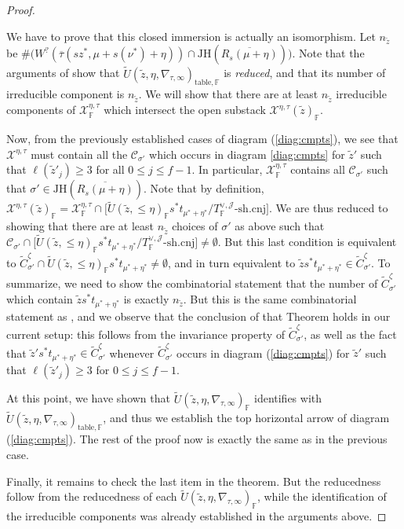 \documentclass[oneside,a4paper,english, 11pt]{amsart}
\theoremstyle{plain}
\theoremstyle{plain}
\theoremstyle{plain}
\theoremstyle{plain}
\theoremstyle{plain}
\theoremstyle{plain}
\theoremstyle{definition}
\theoremstyle{definition}
\theoremstyle{definition}
\theoremstyle{remark}
\numberwithin{equation}{section}
\newcommand{\F}{\mathbb{F}}
\newcommand{\cC}{\mathcal{C}}
\newcommand{\cJ}{\mathcal{J}}
\newcommand{\cX}{\mathcal{X}}
\newcommand{\tld}[1]{\widetilde{#1}}
\newcommand{\taubar}{\overline{\tau}}
\newcommand{\ovl}[1]{\overline{#1}}
\begin{document}
\begin{proof}
\begin{enumerate}
We have to prove that this closed immersion is actually an isomorphism. 
%
Let $n_{\tld{z}}$ be $\# \big(W^?(\taubar(sz^*,\mu+s(\nu^*)+\eta))\cap \mathrm{JH}(\ovl{R_s(\mu+\eta)})\big)$.
%
Note that the arguments of \cite[\S 8]{LLLM} show that $\tld{U}(\tld{z},\eta,\nabla_{\tau,\infty})_{\mathrm{table},\F}$ is \emph{reduced}, and that its number of irreducible component is $n_{\tld{z}}$.
%
%
%
We will show that there are at least $n_{\tld{z}}$ irreducible components of $\cX^{\eta,\tau}_\F$ which intersect the open substack $\cX^{\eta,\tau}(\tld{z})_\F$.

Now, from the previously established cases of diagram (\ref{diag:cmpts}), we see that $\cX^{\eta,\tau}$ must contain all the $\cC_{\sigma'}$ which occurs in diagram \ref{diag:cmpts} for $\tld{z}'$ such that $\ell(\tld{z}'_j)\geq 3$ for all $0\leq j \leq f-1$. In particular, $\cX^{\eta,\tau}_\F$ contains all $\cC_{\sigma'}$ such that $\sigma' \in \mathrm{JH}(\ovl{R_s(\mu+\eta)})$.  %
Note that by definition, $\cX^{\eta,\tau}(\tld{z})_{\F}=\cX^{\eta,\tau}_\F\cap \Big[\tld{U}(\tld{z},\leq \eta)_\F s^*t_{\mu^*+\eta^*}/T^{\vee,\cJ}_\F\text{-sh.cnj}\Big]$. We are thus reduced to showing that there are at least $n_{\tld{z}}$ choices of $\sigma'$ as above such that $\cC_{\sigma'} \cap \Big[\tld{U}(\tld{z},\leq \eta)_\F s^*t_{\mu^*+\eta^*}/T^{\vee,\cJ}_\F\text{-sh.cnj}\Big]\neq \emptyset$. But this last condition is equivalent to $\tld{C}^\zeta_{\sigma'}\cap \tld{U}(\tld{z},\leq \eta)_\F s^*t_{\mu^*+\eta^*}\neq \emptyset$, and in turn equivalent to $\tld{z}s^*t_{\mu^*+\eta^*}\in \tld{C}^{\zeta}_{\sigma'}$. To summarize, we need to show the combinatorial statement that the number of $\tld{C}^{\zeta}_{\sigma'}$ which contain $\tld{z}s^*t_{\mu^*+\eta^*}$ is exactly $n_{\tld{z}}$.
%
But this is the same combinatorial statement as \cite[Theorem 4.7.6]{MLM}, and we observe that the conclusion of that Theorem holds in our current setup: this follows from the invariance property \cite[Proposition 4.3.5]{MLM} of $\tld{C}^{\zeta}_{\sigma'}$, as well as the fact that $\tld{z}'s^*t_{\mu^*+\eta^*}\in \tld{C}^{\zeta}_{\sigma'}$ whenever $\tld{C}^{\zeta}_{\sigma'}$ occurs in diagram (\ref{diag:cmpts}) for $\tld{z}'$ such that $\ell(\tld{z}'_j)\geq 3$ for $0\leq j \leq f-1$.

At this point, we have shown that $\tld{U}(\tld{z},\eta,\nabla_{\tau,\infty})_{\F}$ identifies with $\tld{U}(\tld{z},\eta,\nabla_{\tau,\infty})_{\mathrm{table},\F}$, and thus we establish the top horizontal arrow of diagram (\ref{diag:cmpts}). The rest of the proof now is exactly the same as in the previous case.

\end{enumerate}
Finally, it remains to check the last item in the theorem. But the reducedness follow from the reducedness of each $\tld{U}(\tld{z},\eta,\nabla_{\tau,\infty})_{\F}$, while the identification of the irreducible components was already established in the arguments above.
\end{proof}
\end{document}
